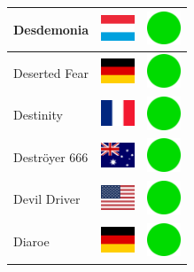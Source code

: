 \documentclass[12pt, a4paper, twoside]{report}
\begin{document}
\begin{center}
\begin{longtable}{|p{5cm}|p{2cm}|p{2cm}|}
Desdemonia & \includegraphics[width=1cm]{4x3/lu} & \includegraphics[width=1cm]{likes/y} \\ \hline
Deserted Fear & \includegraphics[width=1cm]{4x3/de} & \includegraphics[width=1cm]{likes/y} \\ \hline
Destinity & \includegraphics[width=1cm]{4x3/fr} & \includegraphics[width=1cm]{likes/y} \\ \hline
Deströyer 666 & \includegraphics[width=1cm]{4x3/au} & \includegraphics[width=1cm]{likes/y} \\ \hline
Devil Driver & \includegraphics[width=1cm]{4x3/us} & \includegraphics[width=1cm]{likes/y} \\ \hline
Diaroe & \includegraphics[width=1cm]{4x3/de} & \includegraphics[width=1cm]{likes/y} \\ \hline

\end{longtable}
\end{center}
\end{document}
